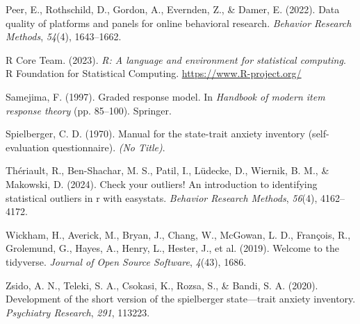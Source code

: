 \documentclass[
  jou,
  floatsintext,
  longtable,
  nolmodern,
  notxfonts,
  notimes,
  colorlinks=true,linkcolor=blue,citecolor=blue,urlcolor=blue]{apa7}
\newlength{\cslhangindent}
\newenvironment{CSLReferences}[2] %
 {\begin{list}{}{%
  \setlength{\itemindent}{0pt}
  \setlength{\leftmargin}{0pt}
  \setlength{\parsep}{0pt}
  \ifodd #1
   \setlength{\leftmargin}{\cslhangindent}
   \setlength{\itemindent}{-1\cslhangindent}
  \fi
  \setlength{\itemsep}{#2\baselineskip}}}
 {\end{list}}
\begin{document}
\begin{CSLReferences}{1}{0}
Peer, E., Rothschild, D., Gordon, A., Evernden, Z., \& Damer, E. (2022).
Data quality of platforms and panels for online behavioral research.
\emph{Behavior Research Methods}, \emph{54}(4), 1643--1662.

R Core Team. (2023). \emph{R: A language and environment for statistical
computing}. R Foundation for Statistical Computing.
\url{https://www.R-project.org/}

Samejima, F. (1997). Graded response model. In \emph{Handbook of modern
item response theory} (pp. 85--100). Springer.

Spielberger, C. D. (1970). Manual for the state-trait anxiety inventory
(self-evaluation questionnaire). \emph{(No Title)}.

Thériault, R., Ben-Shachar, M. S., Patil, I., Lüdecke, D., Wiernik, B.
M., \& Makowski, D. (2024). Check your outliers﻿! An introduction to
identifying statistical outliers in r with easystats. \emph{Behavior
Research Methods}, \emph{56}(4), 4162--4172.

Wickham, H., Averick, M., Bryan, J., Chang, W., McGowan, L. D.,
François, R., Grolemund, G., Hayes, A., Henry, L., Hester, J., et al.
(2019). Welcome to the tidyverse. \emph{Journal of Open Source
Software}, \emph{4}(43), 1686.

Zsido, A. N., Teleki, S. A., Csokasi, K., Rozsa, S., \& Bandi, S. A.
(2020). Development of the short version of the spielberger
state---trait anxiety inventory. \emph{Psychiatry Research}, \emph{291},
113223.

\end{CSLReferences}
\end{document}
